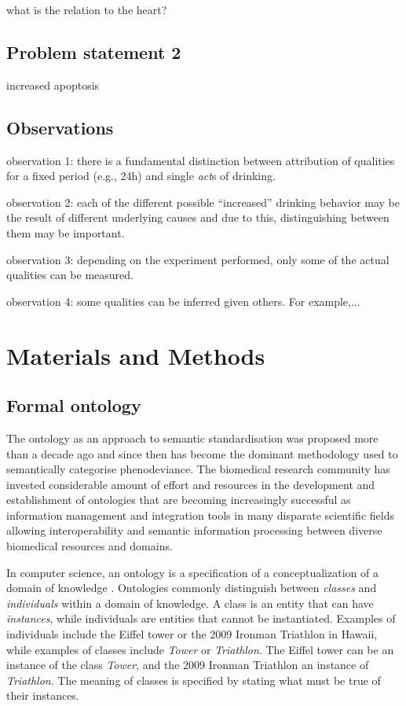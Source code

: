 \documentclass{bioinfo}
\renewcommand{\cite}{\citep}
\begin{document}
what is the relation to the heart?


\subsection{Problem statement 2}
increased apoptosis

\subsection{Observations}
observation 1: there is a fundamental distinction between attribution
of qualities for a fixed period (e.g., 24h) and single {\em act}s of
drinking.

observation 2: each of the different possible ``increased'' drinking
behavior may be the result of different underlying causes and due to
this, distinguishing between them may be important.

observation 3: depending on the experiment performed, only some of the
actual qualities can be measured.

observation 4: some qualities can be inferred given others. For
example,...

\section{Materials and Methods}
\subsection{Formal ontology}
The ontology as an approach to semantic standardisation was proposed
more than a decade ago and since then has become the dominant
methodology used to semantically categorise phenodeviance.  The
biomedical research community has invested considerable amount of
effort and resources in the development and establishment of
ontologies that are becoming increasingly successful as information
management and integration tools in many disparate scientific fields
allowing interoperability and semantic information processing between
diverse biomedical resources and domains.

In computer science, an ontology is a specification of a
conceptualization of a domain of knowledge \cite{Gruber1995,
  Guarino1998}.  Ontologies commonly distinguish between {\em classes}
and {\em individuals} within a domain of knowledge. A class is an
entity that can have {\em instances}, while individuals are entities
that cannot be instantiated. Examples of individuals include the
Eiffel tower or the 2009 Ironman Triathlon in Hawaii, while examples
of classes include {\em Tower} or {\em Triathlon}. The Eiffel tower
can be an instance of the class {\em Tower}, and the 2009 Ironman
Triathlon an instance of {\em Triathlon}.  The meaning of classes is
specified by stating what must be true of their instances.
\end{document}
